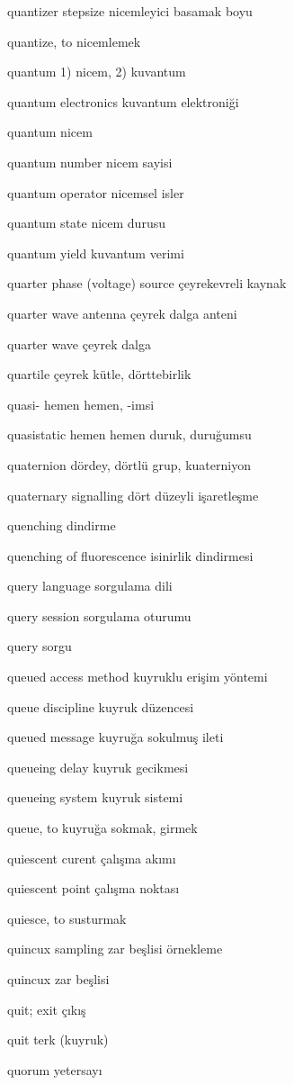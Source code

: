 \documentclass[12pt,fleqn]{article}\usepackage{../../common}
\begin{document}
quantizer stepsize nicemleyici basamak boyu

quantize, to nicemlemek

quantum 1) nicem, 2) kuvantum

quantum electronics kuvantum elektroniği

quantum nicem

quantum number nicem sayisi

quantum operator nicemsel isler

quantum state nicem durusu

quantum yield kuvantum verimi

quarter phase (voltage) source çeyrekevreli kaynak

quarter wave antenna çeyrek dalga anteni

quarter wave çeyrek dalga

quartile çeyrek kütle, dörttebirlik

quasi- hemen hemen, -imsi

quasistatic hemen hemen duruk, duruğumsu

quaternion dördey, dörtlü grup, kuaterniyon

quaternary signalling dört düzeyli işaretleşme

quenching dindirme

quenching of fluorescence isinirlik dindirmesi

query language sorgulama dili

query session sorgulama oturumu

query sorgu

queued access method kuyruklu erişim yöntemi

queue discipline kuyruk düzencesi

queued message kuyruğa sokulmuş ileti

queueing delay kuyruk gecikmesi

queueing system kuyruk sistemi

queue, to kuyruğa sokmak, girmek

quiescent curent çalışma akımı

quiescent point çalışma noktası

quiesce, to susturmak

quincux sampling zar beşlisi örnekleme

quincux zar beşlisi

quit; exit çıkış

quit terk (kuyruk)

quorum yetersayı
\end{document}
